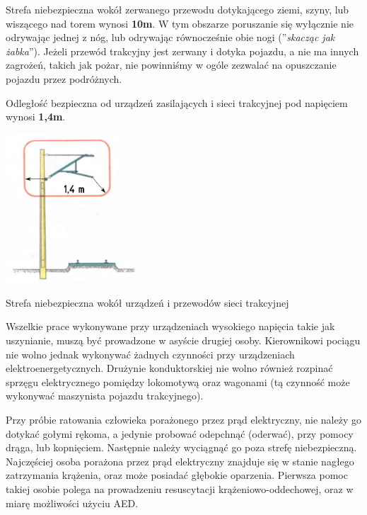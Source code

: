 Strefa niebezpieczna wokół zerwanego przewodu dotykającego ziemi, szyny, lub wiszącego nad torem wynosi \textbf{10m}. W tym obszarze poruszanie się wyłącznie nie odrywając jednej z nóg, lub odrywając równocześnie obie nogi (''\textit{skacząc jak żabka}''). Jeżeli przewód trakcyjny jest zerwany i dotyka pojazdu, a nie ma innych zagrożeń, takich jak pożar, nie powinniśmy w ogóle zezwalać na opuszczanie pojazdu przez podróżnych.

Odległość bezpieczna od urządzeń zasilających i sieci trakcyjnej pod napięciem wynosi \textbf{1,4m}.
\begin{marginfigure}
	\includegraphics[width=5cm]{skryptkierownik-img/strefa-niebezpieczna-trakcja-14.png}
	\caption{Strefa niebezpieczna wokół urządzeń i przewodów sieci trakcyjnej}
	\label{fig:strefa}
\end{marginfigure}
Wszelkie prace wykonywane przy urządzeniach wysokiego napięcia takie jak uszynianie, muszą być prowadzone w asyście drugiej osoby. Kierownikowi pociągu nie wolno jednak wykonywać żadnych czynności przy urządzeniach elektroenergetycznych. Drużynie konduktorskiej nie wolno również rozpinać sprzęgu elektrycznego pomiędzy lokomotywą oraz wagonami (tą czynność może wykonywać maszynista pojazdu trakcyjnego).

Przy próbie ratowania człowieka porażonego przez prąd elektryczny, nie należy go dotykać gołymi rękoma, a jedynie probować odepchnąć (oderwać), przy pomocy drąga, lub kopnięciem. Następnie należy wyciągnąć go poza strefę niebezpieczną. Najczęściej osoba porażona przez prąd elektryczny znajduje się w stanie nagłego zatrzymania krążenia, oraz może posiadać głębokie oparzenia. Pierwsza pomoc takiej osobie polega na prowadzeniu resuscytacji krążeniowo-oddechowej, oraz w miarę możliwości użyciu AED.






